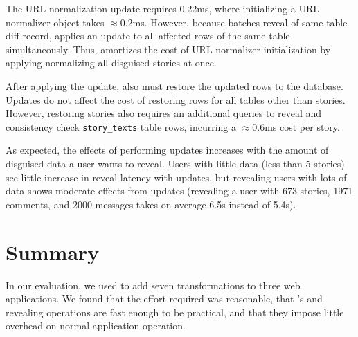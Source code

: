 %
The URL normalization update requires 0.22ms, where initializing a URL
normalizer object takes $\approx$0.2ms.
%
However, because \sys batches reveal of same-table diff record, \sys applies an
update to all affected rows of the same table simultaneously. Thus, \sys
amortizes the cost of URL normalizer initialization by applying normalizing
all disguised stories at once.
%

%
After applying the update, \sys also must restore the updated rows to the
database. Updates do not affect the cost of restoring rows for all tables other
than stories.  However, restoring stories also requires an additional queries to
reveal and consistency check \texttt{story\_texts} table rows, incurring a
$\approx$0.6ms cost per story.
%

%
As expected, the effects of performing updates increases with the amount of
disguised data a user wants to reveal.
%
Users with little data (\eg less than 5 stories) see little increase in reveal
latency with updates, but revealing users with lots of data shows moderate
effects from updates (\eg revealing a user with 673 stories, 1971 comments, and
2000 messages takes on average 6.5s instead of 5.4s).
%

%
\section{Summary}
In our evaluation, we used \sys to add seven \xxing transformations to three web
applications. We found that the effort required was reasonable, that \sys's
\xxing and revealing operations are fast enough to be practical, and that they
impose little overhead on normal application operation.
%
